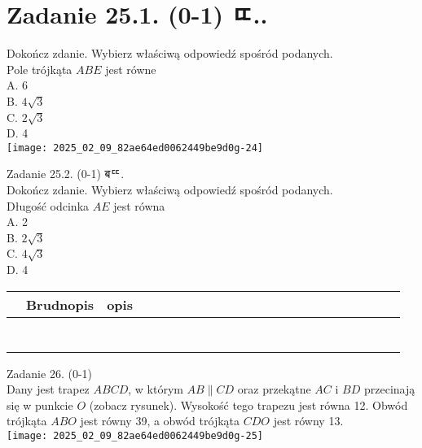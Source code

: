 \documentclass[10pt]{article}
\begin{document}
\section*{Zadanie 25.1. (0-1) ㄸ..}
Dokończ zdanie. Wybierz właściwą odpowiedź spośród podanych.\\
Pole trójkąta \(A B E\) jest równe\\
A. 6\\
B. \(4 \sqrt{3}\)\\
C. \(2 \sqrt{3}\)\\
D. 4\\
\texttt{[image: 2025\_02\_09\_82ae64ed0062449be9d0g-24]}

Zadanie 25.2. (0-1) बᄄ.\\
Dokończ zdanie. Wybierz właściwą odpowiedź spośród podanych.\\
Długość odcinka \(A E\) jest równa\\
A. 2\\
B. \(2 \sqrt{3}\)\\
C. \(4 \sqrt{3}\)\\
D. 4

\begin{center}
\begin{tabular}{|c|c|c|c|c|c|c|c|c|c|c|c|c|c|c|c|c|c|c|c|c|c|c|}
\hline
 & Brudnopis & opis &  &  &  &  &  &  &  &  &  &  &  &  &  &  &  &  &  &  &  &  \\
\hline
 &  &  &  &  &  &  &  &  &  &  &  &  &  &  &  &  &  &  &  &  &  &  \\
\hline
 &  &  &  &  &  &  &  &  &  &  &  &  &  &  &  &  &  &  &  &  &  &  \\
\hline
 &  &  &  &  &  &  &  &  &  &  &  &  &  &  &  &  &  &  &  &  &  &  \\
\hline
 &  &  &  &  &  &  &  &  &  &  &  &  &  &  &  &  &  &  &  &  &  &  \\
\hline
 &  &  &  &  &  &  &  &  &  &  &  &  &  &  &  &  &  &  &  &  &  &  \\
\hline
 &  &  &  &  &  &  &  &  &  &  &  &  &  &  &  &  &  &  &  &  &  &  \\
\hline
 &  &  &  &  &  &  &  &  &  &  &  &  &  &  &  &  &  &  &  &  &  &  \\
\hline
\end{tabular}
\end{center}

Zadanie 26. (0-1)\\
Dany jest trapez \(A B C D\), w którym \(A B \| C D\) oraz przekątne \(A C\) i \(B D\) przecinają się w punkcie \(O\) (zobacz rysunek). Wysokość tego trapezu jest równa 12. Obwód trójkąta \(A B O\) jest równy 39, a obwód trójkąta \(C D O\) jest równy 13.\\
\texttt{[image: 2025\_02\_09\_82ae64ed0062449be9d0g-25]}
\end{document}
